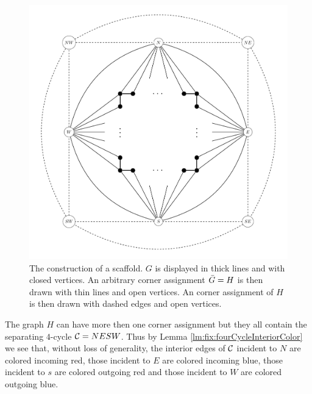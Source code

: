   \begin{figure}[h!]
  \centering
  \includegraphics[scale=0.5]{fixExtension/img/scafold}

  \caption{The construction of a scaffold. $G$ is displayed in thick lines and with closed vertices. An arbitrary corner assignment $\bar{G} =H$ is then drawn with thin lines and open vertices. An corner assignment of $H$ is then drawn with dashed edges and open vertices.
      \label{fig:scafold}}
  \end{figure}


  The graph $H$ can have more then one corner assignment but they all contain the separating $4$-cycle $\mathcal{C}= NESW$. Thus by Lemma \ref{lm:fix:fourCycleInteriorColor} we see that, without loss of generality, the interior edges of $\mathcal{C}$ incident to $N$ are colored incoming red, those incident to $E$ are colored incoming blue, those incident to $s$ are colored outgoing red and those incident to $W$ are colored outgoing blue.

